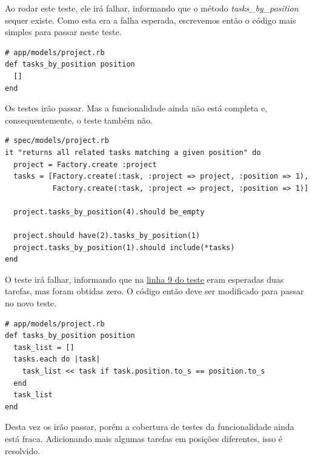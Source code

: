 Ao rodar este teste, ele irá falhar, informando que o método \textit{tasks\_by\_position} sequer existe. Como esta era a falha esperada, escrevemos então o código mais simples para passar neste teste.

\begin{lstlisting}[caption=Código do método Project\#tasks\_by\_position (versão 1),label=code:tdd_code1]
# app/models/project.rb
def tasks_by_position position
  []
end
\end{lstlisting}

Os testes irão passar. Mas a funcionalidade ainda não está completa e, consequentemente, o teste também não.

\begin{lstlisting}[caption=Teste do método Project\#tasks\_by\_position (versão 2),label=code:tdd_spec2]
# spec/models/project.rb
it "returns all related tasks matching a given position" do
  project = Factory.create :project
  tasks = [Factory.create(:task, :project => project, :position => 1),
           Factory.create(:task, :project => project, :position => 1)]

  project.tasks_by_position(4).should be_empty

  project.should have(2).tasks_by_position(1)
  project.tasks_by_position(1).should include(*tasks)
end
\end{lstlisting}

O teste irá falhar, informando que na \hyperref[code:tdd_spec1]{linha 9 do teste} eram esperadas duas tarefas, mas foram obtidas zero. O código então deve ser modificado para passar no novo teste.

\begin{lstlisting}[caption=Código do método Project\#tasks\_by\_position (versão 2),label=code:tdd_code2]
# app/models/project.rb
def tasks_by_position position
  task_list = []
  tasks.each do |task|
    task_list << task if task.position.to_s == position.to_s
  end
  task_list
end
\end{lstlisting}

Desta vez os irão passar, porém a cobertura de testes da funcionalidade ainda está fraca. Adicionando mais algumas tarefas em posições diferentes, isso é resolvido.

